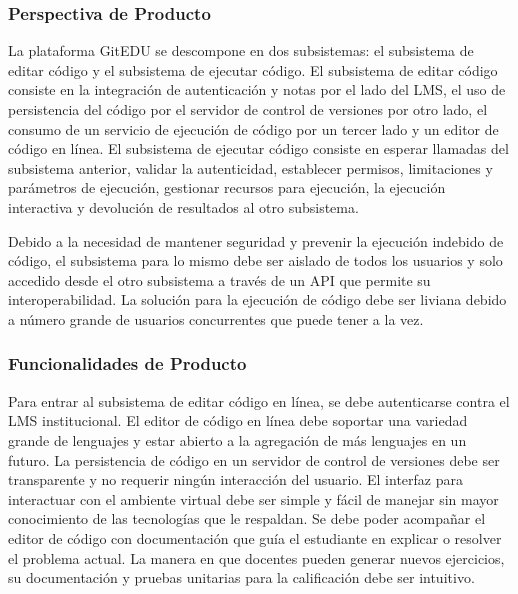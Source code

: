 \subsubsection{Perspectiva de Producto}
    
La plataforma GitEDU se descompone en dos subsistemas: el subsistema de editar código y el subsistema de ejecutar código. El subsistema de editar código consiste en la integración de autenticación y notas por el lado del LMS, el uso de persistencia del código por el servidor de control de versiones por otro lado, el consumo de un servicio de ejecución de código por un tercer lado y un editor de código en línea. El subsistema de ejecutar código consiste en esperar llamadas del subsistema anterior, validar la autenticidad, establecer permisos, limitaciones y parámetros de ejecución, gestionar recursos para ejecución, la ejecución interactiva y devolución de resultados al otro subsistema.

Debido a la necesidad de mantener seguridad y prevenir la ejecución indebido de código, el subsistema para lo mismo debe ser aislado de todos los usuarios y solo accedido desde el otro subsistema a través de un API que permite su interoperabilidad. La solución para la ejecución de código debe ser liviana debido a número grande de usuarios concurrentes que puede tener a la vez.

\subsubsection{Funcionalidades de Producto}
    
Para entrar al subsistema de editar código en línea, se debe autenticarse contra el LMS  institucional. El editor de código en línea debe soportar una variedad grande de lenguajes y estar abierto a la agregación de más lenguajes en un futuro. La persistencia de código en un servidor de control de versiones debe ser transparente y no requerir ningún interacción del usuario. El interfaz para interactuar con el ambiente virtual debe ser simple y fácil de manejar sin mayor conocimiento de las tecnologías que le respaldan. Se debe poder acompañar el editor de código con documentación que guía el estudiante en explicar o resolver el problema actual. La manera en que docentes pueden generar nuevos ejercicios, su documentación y pruebas unitarias para la calificación debe ser intuitivo.

